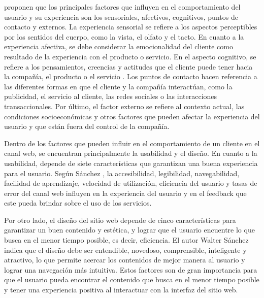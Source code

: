 \cite{lemon2016customer} proponen que los principales factores que influyen en el comportamiento del usuario y su experiencia son los sensoriales, afectivos, cognitivos, puntos de contacto y externos. La experiencia sensorial se refiere a los aspectos perceptibles por los sentidos del cuerpo, como la vista, el olfato y el tacto. En cuanto a la experiencia afectiva, se debe considerar la emocionalidad del cliente como resultado de la experiencia con el producto o servicio. En el aspecto cognitivo, se refiere a los pensamientos, creencias y actitudes que el cliente puede tener hacia la compañía, el producto o el servicio \cite{lemon2016customer}. Los puntos de contacto hacen referencia a las diferentes formas en que el cliente y la compañía interactúan, como la publicidad, el servicio al cliente, las redes sociales o las interacciones transaccionales. Por último, el factor externo se refiere al contexto actual, las condiciones socioeconómicas y otros factores que pueden afectar la experiencia del usuario y que están fuera del control de la compañía.

Dentro de los factores que pueden influir en el comportamiento de un cliente en el canal web, se encuentran principalmente la usabilidad y el diseño. En cuanto a la usabilidad, depende de siete características que garantizan una buena experiencia para el usuario. Según Sánchez \cite{Usabilidad=softw}, la accesibilidad, legibilidad, navegabilidad, facilidad de aprendizaje, velocidad de utilización, eficiencia del usuario y tasas de error del canal web influyen en la experiencia del usuario y en el feedback que este pueda brindar sobre el uso de los servicios.

Por otro lado, el diseño del sitio web depende de cinco características para garantizar un buen contenido y estética, y lograr que el usuario encuentre lo que busca en el menor tiempo posible, es decir, eficiencia. El autor Walter Sánchez \cite{Usabilidad=softw} indica que el diseño debe ser entendible, novedoso, comprensible, inteligente y atractivo, lo que permite acercar los contenidos de mejor manera al usuario y lograr una navegación más intuitiva. Estos factores son de gran importancia para que el usuario pueda encontrar el contenido que busca en el menor tiempo posible y tener una experiencia positiva al interactuar con la interfaz del sitio web.
